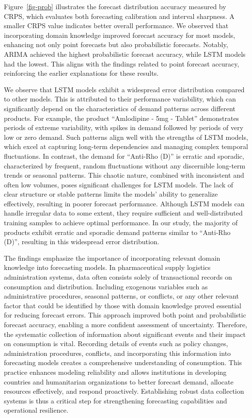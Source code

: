\documentclass[
  authoryear,
  preprint,
  3p]{elsarticle}
\begin{document}
Figure~\ref{fig-prob} illustrates the forecast distribution accuracy
measured by CRPS, which evaluates both forecasting calibration and
interval sharpness. A smaller CRPS value indicates better overall
performance. We observed that incorporating domain knowledge improved
forecast accuracy for most models, enhancing not only point forecasts
but also probabilistic forecasts. Notably, ARIMA achieved the highest
probabilistic forecast accuracy, while LSTM models had the lowest. This
aligns with the findings related to point forecast accuracy, reinforcing
the earlier explanations for these results.

We observe that LSTM models exhibit a widespread error distribution
compared to other models. This is attributed to their performance
variability, which can significantly depend on the characteristics of
demand patterns across different products. For example, the product
``Amlodipine - 5mg - Tablet'' demonstrates periods of extreme
variability, with spikes in demand followed by periods of very low or
zero demand. Such patterns align well with the strengths of LSTM models,
which excel at capturing long-term dependencies and managing complex
temporal fluctuations. In contrast, the demand for ``Anti-Rho (D)'' is
erratic and sporadic, characterized by frequent, random fluctuations
without any discernible long-term trends or seasonal patterns. This
chaotic nature, combined with inconsistent and often low volumes, poses
significant challenges for LSTM models. The lack of clear structure or
stable patterns limits the models' ability to generalize effectively,
resulting in poorer forecast performance. Although LSTM models can
handle irregular data to some extent, they require sufficient and
well-distributed training samples to achieve optimal performance. In our
study, the majority of products exhibit erratic and sporadic demand
patterns similar to ``Anti-Rho (D)'', resulting in this widespread error
distribution.

The findings emphasize the importance of incorporating relevant domain
knowledge into forecasting models. In pharmaceutical supply logistics
administration systems, data often consists solely of transactional
records on consumption and distribution. Including exogenous variables
such as administrative procedures, seasonal patterns, or conflicts, or
any other relevant factor that could be identified by those with domain
knowledge proved essential for reducing forecast errors. This approach
improved both point and probabilistic forecast accuracy, enabling a more
confident assessment of uncertainty. Therefore, the systematic
collection of information about significant events and their impact on
consumption is vital. Recording details of events such as policy
changes, administration procedures, conflicts, and incorporating this
information into forecasting models creates a comprehensive
understanding of consumption. This practice enhances modeling
reliability and allows institutions in developing countries and
humanitarian organizations to better forecast demand, allocate resources
effectively, and respond proactively. Establishing robust data
collection systems is thus a critical step for strengthening forecasting
capabilities and operational resilience.
\end{document}
